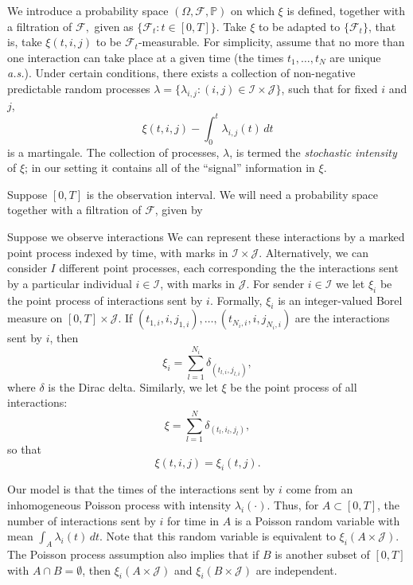 \documentclass[aoas,preprint]{imsart}
\begin{document}
We introduce a probability space $(\Omega, \mathcal{F}, \mathbb{P})$ on which
$\xi$ is defined, together with a filtration of $\mathcal{F},$ given as
$\big\{ \mathcal{F}_t : t \in [0, T] \big\}$. Take $\xi$ to be adapted to $\{
\mathcal{F}_t \}$, that is, take $\xi(t, i, j)$ to be
$\mathcal{F}_t$-measurable. For simplicity, assume that no more than one
interaction can take place at a given time (the times $t_1, \ldots, t_N$ are
unique \textit{a.s.}). Under certain conditions, there exists a collection of
non-negative predictable random processes $\lambda = \{ \lambda_{i,j} : (i,j)
\in \mathcal{I} \times \mathcal{J} \}$, such that for fixed $i$ and $j$,
\[
    \xi(t, i, j) - \int_{0}^{t} \lambda_{i,j}(t) \, dt
\]
is a martingale.  The collection of processes, $\lambda$, is termed the
\emph{stochastic intensity} of $\xi$; in our setting it contains all of the
``signal'' information in $\xi$.


\clearpage


Suppose $[0,T]$ is the observation
interval.  We will need a probability space
 together with a filtration of
$\mathcal{F}$, given by


Suppose we observe interactions  We
can represent these interactions by a marked point process indexed by time,
with marks in $\mathcal{I} \times \mathcal{J}$. Alternatively, we can consider
$I$ different point processes, each corresponding the the interactions sent by
a particular individual $i \in \mathcal{I}$, with marks in $\mathcal{J}$. For
sender $i \in \mathcal{I}$ we let $\xi_i$ be the point process of interactions
sent by $i$. Formally, $\xi_i$ is an integer-valued Borel measure on $[0,T]
\times \mathcal{J}$. If $(t_{1,i}, i, j_{1,i}), \ldots, (t_{N_i, i}, i,
j_{N_i,i})$ are the interactions sent by $i$, then
\[
    \xi_i = \sum_{l=1}^{N_i} \delta_{(t_{l,i}, j_{l,i})},
\]
where $\delta$ is the Dirac delta.  Similarly, we let $\xi$ be the point
process of all interactions:
\[
    \xi = \sum_{l=1}^{N} \delta_{(t_l, i_l, j_l)},
\]
so that
\[
    \xi(t, i, j) = \xi_i(t, j).
\]

Our model is that the times of the interactions sent by $i$ come from an inhomogeneous Poisson process with intensity $\lambda_i(\cdot)$.  Thus,
for $A \subset [0,T]$, the number of interactions sent by $i$ for time
in $A$ is a Poisson random variable with mean $\int_A \lambda_i(t) \, dt$.
Note that this random variable is equivalent to
\(
    \xi_i(A \times \mathcal{J}).
\)
The Poisson process assumption also implies that if $B$ is another subset 
of $[0,T]$ with $A \cap B = \emptyset$, then
\(
    \xi_i(A \times \mathcal{J})
\)
and
\(
    \xi_i(B \times \mathcal{J})
\)
are independent.
\end{document}
